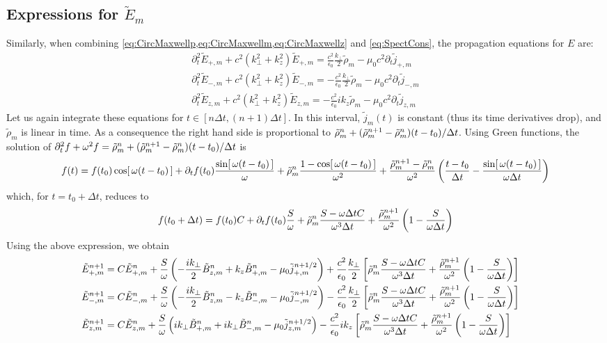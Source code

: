 \subsection{Expressions for $\tilde{E}_m$}

Similarly, when combining \cref{eq:CircMaxwellp,eq:CircMaxwellm,eq:CircMaxwellz}
and \cref{eq:SpectCons}, the propagation equations for $E$ are:
\begin{align*}
\partial_t^2 \tilde{E}_{+,m} + c^2(k_\perp^2 + k_z^2) \tilde{E}_{+,m}
= \frac{c^2}{\epsilon_0} \frac{k_\perp}{2} \tilde{\rho}_m -
\mu_0c^2 \partial_t\tilde{j}_{+,m} \\
\partial_t^2 \tilde{E}_{-,m} + c^2(k_\perp^2 + k_z^2) \tilde{E}_{-,m}
= - \frac{c^2}{\epsilon_0} \frac{k_\perp}{2} \tilde{\rho}_m -
\mu_0c^2 \partial_t\tilde{j}_{-,m} \\
\partial_t^2 \tilde{E}_{z,m} + c^2(k_\perp^2 + k_z^2) \tilde{E}_{z,m}
= - \frac{c^2}{\epsilon_0} i k_z \tilde{\rho}_m -
\mu_0c^2 \partial_t\tilde{j}_{z,m} 
\end{align*}
Let us again integrate these equations for $t\in [n\Delta t, (n+1)\Delta
t]$. In this interval, $\tilde{j}_m(t)$ is constant (thus its time
derivatives drop), and $\tilde{\rho}_m$ is linear in time. As a
consequence the right hand side is proportional to $\tilde{\rho}_{m}^{n} +
(\tilde{\rho}_{m}^{n+1}-\tilde{\rho}_{m}^{n})(t-t_0)/\Delta t$. Using Green functions, the solution of 
$ \partial_t^2 f + \omega^2 f = \tilde{\rho}_{m}^{n} + (\tilde{\rho}_{m}^{n+1}-\tilde{\rho}_{m}^{n})(t-t_0)/\Delta t $ is
\[ f(t) = f(t_0) \cos[\,\omega(t-t_0)\,] + \partial_tf (t_0)
\frac{\sin[\,\omega(t-t_0)\,]}{\omega} + \tilde{\rho}_{m}^{n}\frac{1-
  \cos[\,\omega(t-t_0)\,]}{\omega^2} + \frac{\tilde{\rho}_{m}^{n+1}-\tilde{\rho}_{m}^{n}}{\omega^2}\left(
  \frac{t-t_0}{\Delta t} - \frac{\sin[\,\omega(t-t_0)\,]}{\omega
    \Delta t}
\right) \]
which, for $t=t_0 +\Delta t$, reduces to
\[ f(t_0 +\Delta t) = f(t_0) C + \partial_tf (t_0)
\frac{S}{\omega} + \tilde{\rho}_{m}^{n}\frac{S-\omega\Delta t
  C}{\omega^3\Delta t} + \frac{\tilde{\rho}_{m}^{n+1}}{\omega^2}\left(
  1 - \frac{S}{\omega\Delta t}\right) \]
Using the above expression, we obtain
\begin{align*}
\tilde{E}_{+,m}^{n+1} = \; & C \tilde{E}_{+,m}^{n} + 
\frac{S}{\omega}\left(-\frac{ik_\perp }{2} \tilde{B}_{z,m}^{n} + k_z\tilde{B}_{+,m}^{n}
- \mu_0 \tilde{j}_{+,m}^{n+1/2} \right) + \frac{c^2}{\epsilon_0}
\frac{k_\perp}{2}\left[ \tilde{\rho}_{m}^{n}\frac{S-\omega\Delta t
  C}{\omega^3\Delta t} + \frac{\tilde{\rho}_{m}^{n+1}}{\omega^2}\left(
  1 - \frac{S}{\omega\Delta t}\right) \right]  & \\
\tilde{E}_{-,m}^{n+1} =\; & C \tilde{E}_{-,m}^{n} +
\frac{S}{\omega}\left(- \frac{ik_\perp }{2} \tilde{B}_{z,m}^{n} - k_z\tilde{B}_{-,m}^{n}
- \mu_0 \tilde{j}_{-,m}^{n+1/2} \right) - \frac{c^2}{\epsilon_0}
\frac{k_\perp}{2}\left[ \tilde{\rho}_{m}^{n}\frac{S-\omega\Delta t
  C}{\omega^3\Delta t} + \frac{\tilde{\rho}_{m}^{n+1}}{\omega^2}\left(
  1 - \frac{S}{\omega\Delta t}\right) \right]  &\\
\tilde{E}_{z,m}^{n+1} =\; & C \tilde{E}_{z,m}^{n} + 
\frac{S}{\omega}\left(ik_\perp \tilde{B}_{+,m}^{n} + ik_\perp \tilde{B}_{-,m}^{n}
- \mu_0 \tilde{j}_{z,m}^{n+1/2} \right) - \frac{c^2}{\epsilon_0}
ik_z\left[ \tilde{\rho}_{m}^{n}\frac{S-\omega\Delta t
  C}{\omega^3\Delta t} + \frac{\tilde{\rho}_{m}^{n+1}}{\omega^2}\left(
  1 - \frac{S}{\omega\Delta t}\right) \right]  &
\end{align*}
